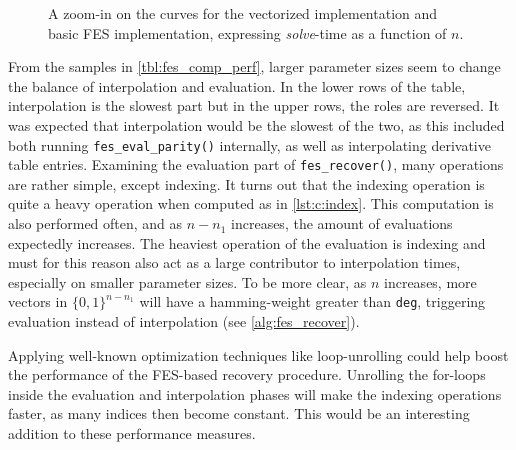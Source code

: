 \begin{figure}[t]
    \centering
    \caption{A zoom-in on the curves for the vectorized implementation and basic FES implementation, expressing \textit{solve}-time as a function of $n$.} \label{fig:time_avx_fes}
\end{figure}
From the samples in \cref{tbl:fes_comp_perf}, larger parameter sizes seem to change the balance of interpolation and evaluation. In the lower rows of the table, interpolation is the slowest part but in the upper rows, the roles are reversed. It was expected that interpolation would be the slowest of the two, as this included both running \texttt{fes\_eval\_parity()} internally, as well as interpolating derivative table entries. Examining the evaluation part of \texttt{fes\_recover()}, many operations are rather simple, except indexing. It turns out that the indexing operation is quite a heavy operation when computed as in \cref{lst:c:index}. This computation is also performed often, and as $n - n_1$ increases, the amount of evaluations expectedly increases. The heaviest operation of the evaluation is indexing and must for this reason also act as a large contributor to interpolation times, especially on smaller parameter sizes. To be more clear, as $n$ increases, more vectors in $\{0,1\}^{n - n_1}$ will have a hamming-weight greater than \texttt{deg}, triggering evaluation instead of interpolation (see \cref{alg:fes_recover}).

Applying well-known optimization techniques like loop-unrolling could help boost the performance of the FES-based recovery procedure. Unrolling the for-loops inside the evaluation and interpolation phases will make the indexing operations faster, as many indices then become constant. This would be an interesting addition to these performance measures.

